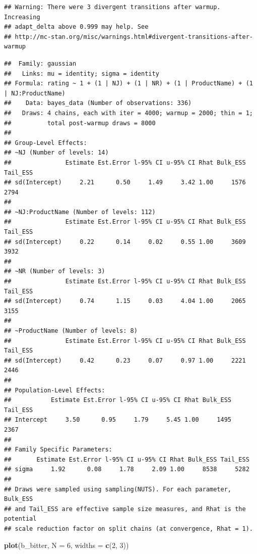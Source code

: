 \documentclass[
]{book}
\newenvironment{Shaded}{\begin{snugshade}}{\end{snugshade}}
\newcommand{\AttributeTok}[1]{\textcolor[rgb]{0.13,0.29,0.53}{#1}}
\newcommand{\DecValTok}[1]{\textcolor[rgb]{0.00,0.00,0.81}{#1}}
\newcommand{\FunctionTok}[1]{\textcolor[rgb]{0.13,0.29,0.53}{\textbf{#1}}}
\newcommand{\NormalTok}[1]{#1}
\begin{document}
\begin{verbatim}
## Warning: There were 3 divergent transitions after warmup. Increasing
## adapt_delta above 0.999 may help. See
## http://mc-stan.org/misc/warnings.html#divergent-transitions-after-warmup
\end{verbatim}

\begin{verbatim}
##  Family: gaussian 
##   Links: mu = identity; sigma = identity 
## Formula: rating ~ 1 + (1 | NJ) + (1 | NR) + (1 | ProductName) + (1 | NJ:ProductName) 
##    Data: bayes_data (Number of observations: 336) 
##   Draws: 4 chains, each with iter = 4000; warmup = 2000; thin = 1;
##          total post-warmup draws = 8000
## 
## Group-Level Effects: 
## ~NJ (Number of levels: 14) 
##               Estimate Est.Error l-95% CI u-95% CI Rhat Bulk_ESS Tail_ESS
## sd(Intercept)     2.21      0.50     1.49     3.42 1.00     1576     2794
## 
## ~NJ:ProductName (Number of levels: 112) 
##               Estimate Est.Error l-95% CI u-95% CI Rhat Bulk_ESS Tail_ESS
## sd(Intercept)     0.22      0.14     0.02     0.55 1.00     3609     3932
## 
## ~NR (Number of levels: 3) 
##               Estimate Est.Error l-95% CI u-95% CI Rhat Bulk_ESS Tail_ESS
## sd(Intercept)     0.74      1.15     0.03     4.04 1.00     2065     3155
## 
## ~ProductName (Number of levels: 8) 
##               Estimate Est.Error l-95% CI u-95% CI Rhat Bulk_ESS Tail_ESS
## sd(Intercept)     0.42      0.23     0.07     0.97 1.00     2221     2446
## 
## Population-Level Effects: 
##           Estimate Est.Error l-95% CI u-95% CI Rhat Bulk_ESS Tail_ESS
## Intercept     3.50      0.95     1.79     5.45 1.00     1495     2367
## 
## Family Specific Parameters: 
##       Estimate Est.Error l-95% CI u-95% CI Rhat Bulk_ESS Tail_ESS
## sigma     1.92      0.08     1.78     2.09 1.00     8538     5282
## 
## Draws were sampled using sampling(NUTS). For each parameter, Bulk_ESS
## and Tail_ESS are effective sample size measures, and Rhat is the potential
## scale reduction factor on split chains (at convergence, Rhat = 1).
\end{verbatim}

\begin{Shaded}
\begin{Highlighting}[]
\FunctionTok{plot}\NormalTok{(b\_bitter, }\AttributeTok{N =} \DecValTok{6}\NormalTok{, }\AttributeTok{widths =} \FunctionTok{c}\NormalTok{(}\DecValTok{2}\NormalTok{, }\DecValTok{3}\NormalTok{))}
\end{Highlighting}
\end{Shaded}
\end{document}
